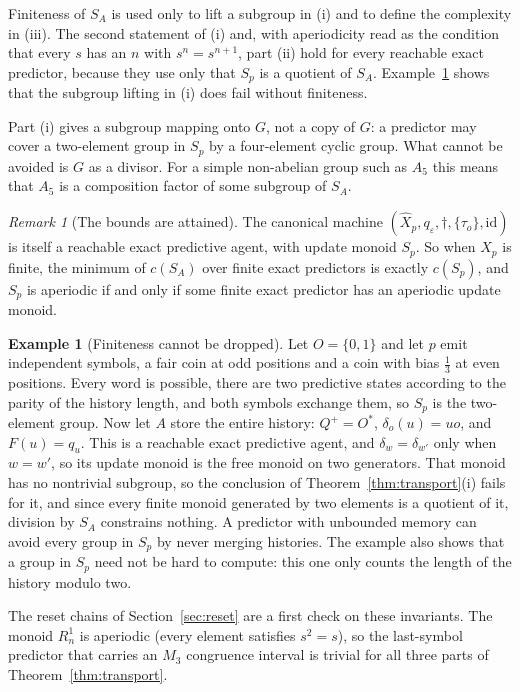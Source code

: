 \documentclass[10pt]{article}
\theoremstyle{definition}
\newtheorem{example}[theorem]{Example}
\theoremstyle{remark}
\newtheorem{remark}[theorem]{Remark}
\newcommand{\Obs}{O}
\newcommand{\eps}{\varepsilon}
\newcommand{\id}{\mathrm{id}}
\begin{document}
Finiteness of $S_A$ is used only to lift a subgroup in (i) and to
define the complexity in (iii).  The second statement of (i) and, with
aperiodicity read as the condition that every $s$ has an $n$ with
$s^n=s^{n+1}$, part (ii) hold for every reachable exact predictor,
because they use only that $S_p$ is a quotient of $S_A$.
Example~\ref{ex:free-predictor} shows that the subgroup lifting in (i)
does fail without finiteness.

Part (i) gives a subgroup mapping onto $G$, not a copy of $G$: a
predictor may cover a two-element group in $S_p$ by a four-element
cyclic group.  What cannot be avoided is $G$ as a divisor.  For a
simple non-abelian group such as $A_5$ this means that $A_5$ is a
composition factor of some subgroup of $S_A$.

\begin{remark}[The bounds are attained]
\label{rem:tight}
The canonical machine
$(\widehat X_p,q_\eps,\dagger,\{\tau_o\},\id)$ is itself a reachable
exact predictive agent, with update monoid $S_p$.  So when $X_p$ is
finite, the minimum of $c(S_A)$ over finite exact predictors is
exactly $c(S_p)$, and $S_p$ is aperiodic if and only if some finite
exact predictor has an aperiodic update monoid.
\end{remark}

\begin{example}[Finiteness cannot be dropped]
\label{ex:free-predictor}
Let $\Obs=\{0,1\}$ and let $p$ emit independent symbols, a fair coin
at odd positions and a coin with bias $\tfrac13$ at even positions.
Every word is possible, there are two predictive states according to
the parity of the history length, and both symbols exchange them, so
$S_p$ is the two-element group.  Now let $A$ store the entire
history: $Q^+=\Obs^*$, $\delta_o(u)=uo$, and $F(u)=q_u$.  This is a
reachable exact predictive agent, and $\delta_w=\delta_{w'}$ only
when $w=w'$, so its update monoid is the free monoid on two
generators.
That monoid has no nontrivial subgroup, so the conclusion of
Theorem~\ref{thm:transport}(i) fails for it, and since every finite
monoid generated by two elements is a quotient of it, division by
$S_A$ constrains nothing.  A predictor with unbounded memory can
avoid every group in $S_p$ by never merging histories.  The example
also shows that a group in $S_p$ need not be hard to compute: this
one only counts the length of the history modulo two.
\end{example}

The reset chains of Section~\ref{sec:reset} are a first check on
these invariants.  The monoid $R_n^1$ is aperiodic (every element
satisfies $s^2=s$), so the last-symbol predictor that carries an $M_3$
congruence interval is trivial for all three parts of
Theorem~\ref{thm:transport}.
\end{document}
